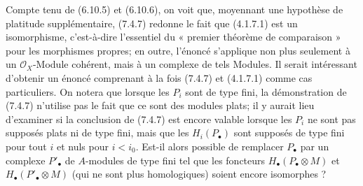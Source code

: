 \begin{remark}[7.4.8]
Compte tenu de (6.10.5) et (6.10.6), on voit que, moyennant une hypothèse de
platitude supplémentaire, (7.4.7) redonne le fait que (4.1.7.1) est un
isomorphisme, c'est-à-dire l'essentiel du « premier théorème de comparaison »
pour les morphismes propres; en outre, l'énoncé s'applique non plus seulement
à un $\mathscr O_X$-Module cohérent, mais à un complexe de tels Modules. Il
serait intéressant d'obtenir un énoncé comprenant à la fois (7.4.7) et
(4.1.7.1) comme cas particuliers. On notera que lorsque les $P_i$ sont de type
fini, la démonstration de (7.4.7) n'utilise pas le fait que ce sont des modules
plats; il y aurait lieu d'examiner si la conclusion de (7.4.7) est encore
valable lorsque les $P_i$ ne sont pas supposés plats ni de type fini, mais que
les $H_i(P_\bullet)$ sont supposés de type fini pour tout $i$ et nuls pour
$i<i_0$. Est-il alors possible de remplacer $P_\bullet$ par un complexe
$P'_\bullet$ de $A$-modules de type fini tel que les foncteurs
$H_\bullet(P_\bullet\otimes M)$ et $H_\bullet(P'_\bullet\otimes M)$ (qui ne
sont plus homologiques) soient encore isomorphes ?
\end{remark}

